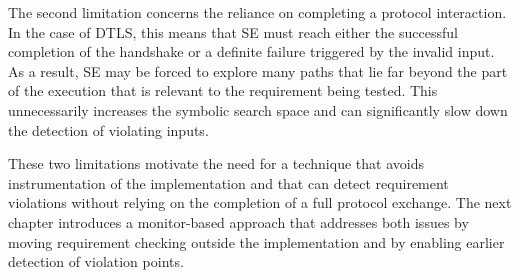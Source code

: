 The second limitation concerns the reliance on completing a protocol interaction.
In the case of DTLS, this means that SE must reach either the successful completion of the handshake or a definite failure triggered by the invalid input.
As a result, SE may be forced to explore many paths that lie far beyond the part of the execution that is relevant to the requirement being tested.
This unnecessarily increases the symbolic search space and can significantly slow down the detection of violating inputs.

These two limitations motivate the need for a technique that avoids instrumentation of the implementation and that can detect requirement violations without relying on the completion of a full protocol exchange.
The next chapter introduces a monitor-based approach that addresses both issues by moving requirement checking outside the implementation and by enabling earlier detection of violation points.